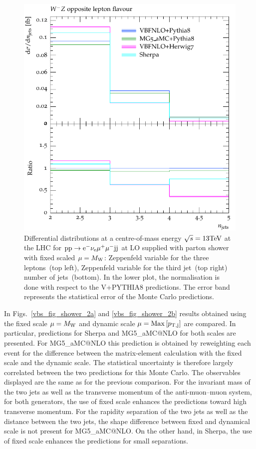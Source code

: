 \documentclass[11pt]{cernrep}
\makeatletter
\newcommand{\MGaMC}{M\protect\scalebox{0.8}{AD}G\protect\scalebox{0.8}{RAPH}5\_aMC@NLO\xspace}
\newcommand{\VBFNLO}{V\protect\scalebox{0.8}{BFNLO}\xspace}
\makeatother
\begin{document}
\begin{figure}[htbp]
\begin{center}
   \includegraphics[scale=0.65]{figs/VBFNLO_WmZ_OF_nJets}
\caption{Differential distributions at a centre-of-mass energy $\sqrt{s}=13{\rm TeV}$ at the LHC for ${\rm p} {\rm p}
  \to {\rm e}^-  \nu_{\rm e}  \mu^+ \mu^- {\rm j} {\rm j}$ at LO supplied with parton shower with fixed scaled $\mu = M_{\rm W}$: 
                Zeppenfeld variable for the three leptons~(top left),
                Zeppenfeld variable for the third jet~(top right)
                number of jets~(bottom). 
                In the lower plot, the normalisation is done with respect to the \VBFNLO+{\sc PYTHIA8} predictions.
                The error band represents
                the statistical error of the Monte Carlo predictions.}
\label{vbs_fig_shower_1b}
\end{center}
\end{figure}

In Figs.~\ref{vbs_fig_shower_2a} and \ref{vbs_fig_shower_2b} results obtained using the fixed scale $\mu = M_{\rm W}$ and dynamic scale $\mu = {\rm Max}\left[p_{\rm T, j}\right]$ are compared.
In particular, predictions for {\sc Sherpa} and \MGaMC for both scales are presented. For
\MGaMC this prediction is obtained by reweighting each event for the difference between the matrix-element calculation
with the fixed scale and the dynamic scale. The statistical uncertainty is therefore largely
correlated between the two predictions for this Monte Carlo.  
The observables displayed are the same as for the previous comparison.
For the invariant mass of the two jets as well as the transverse momentum of the anti-muon--muon system, for both generators, the use of fixed scale enhances the predictions toward high transverse momentum.
For the rapidity separation of the two jets as well as the distance between the two jets, the shape difference between fixed and dynamical scale is not present for \MGaMC.
On the other hand, in {\sc Sherpa}, the use of fixed scale enhances the predictions for small separations.
\end{document}
